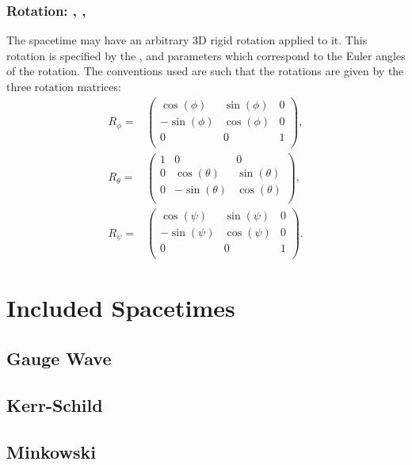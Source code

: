 \documentclass{article}
\begin{document}
\subsubsection{Rotation: , , }
The spacetime may have an arbitrary $3$D rigid rotation applied to it. This
rotation is specified by the ,  and  parameters
which correspond to the Euler angles of the rotation. The conventions used are
such that the rotations are given by the three rotation matrices:
\begin{align}
R_\phi =& 
\left(
\begin{array}{ccc}
 \cos (\phi ) & \sin (\phi ) & 0 \\
 -\sin (\phi ) & \cos (\phi ) & 0 \\
 0 & 0 & 1 \\
\end{array}
\right), \nonumber \\
R_\theta =&
\left(
\begin{array}{ccc}
 1 & 0 & 0 \\
 0 & \cos (\theta ) & \sin (\theta ) \\
 0 & -\sin (\theta ) & \cos (\theta ) \\
\end{array}
\right), \nonumber \\
R_\psi =&
\left(
\begin{array}{ccc}
 \cos (\psi ) & \sin (\psi ) & 0 \\
 -\sin (\psi ) & \cos (\psi ) & 0 \\
 0 & 0 & 1 \\
\end{array}
\right).
\end{align}

\section{Included Spacetimes}

\subsection{Gauge Wave}

\subsection{Kerr-Schild}

\subsection{Minkowski}
\end{document}
